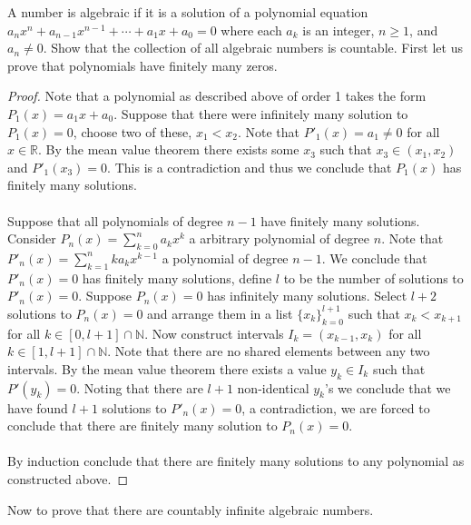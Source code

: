 \documentclass[12pt]{article}
\makeatletter
\theoremstyle{homework}
\newenvironment{exercise}[1]
{\def\@currentlabel{#1}\exercisecore}
{\endexercisecore}
\makeatother
\begin{document}
\begin{exercise}
2
A number is algebraic if it is a solution of a polynomial equation $a_nx^n + a_{n−1}x^{n−1} + \cdots + a_1x + a_0 = 0$ where each $a_k$ is an integer, $n \geq 1$, and $a_n \neq 0$. Show that the collection of all algebraic numbers is countable.
\end{exercise}
First let us prove that polynomials have finitely many zeros.
\begin{proof}
Note that a polynomial as described above of order 1 takes the form $P_1(x)=a_1x+a_0$.  Suppose that there were infinitely many solution to $P_1(x)=0$, choose two of these, $x_1<x_2$.  Note that $P'_1(x)=a_1\neq 0$ for all $x\in\mathbb{R}$.  By the mean value theorem there exists some $x_3$ such that $x_3\in(x_1,x_2)$ and $P'_1(x_3)=0$.  This is a contradiction and thus we conclude that $P_1(x)$ has finitely many solutions.\\\\
Suppose that all polynomials of degree $n-1$ have finitely many solutions.  Consider $P_n(x)=\sum_{k=0}^n a_k x^k$ a arbitrary polynomial of degree $n$.  Note that $P'_n(x)=\sum_{k=1}^n ka_k x^{k-1}$ a polynomial of degree $n-1$.  We conclude that $P'_n(x)=0$ has finitely many solutions, define $l$ to be the number of solutions to $P'_n(x)=0$.  Suppose $P_n(x)=0$ has infinitely many solutions.  Select $l+2$ solutions to $P_n(x)=0$ and arrange them in a list $\{x_k\}_{k=0}^{l+1}$ such that $x_k<x_{k+1}$ for all $k\in [0,l+1]\cap\mathbb{N}$.  Now construct intervals $I_k=(x_{k-1},x_k)$ for all $k\in [1,l+1]\cap\mathbb{N}$.  Note that there are no shared elements between any two intervals.  By the mean value theorem there exists a value $y_k\in I_k$ such that $P'(y_k)=0$.  Noting that there are $l+1$ non-identical $y_k$'s we conclude that we have found $l+1$ solutions to $P'_n(x)=0$, a contradiction, we are forced to conclude that there are finitely many solution to $P_n(x)=0$.\\\\
By induction conclude that there are finitely many solutions to any polynomial as constructed above.
\end{proof}
Now to prove that there are countably infinite algebraic numbers.
\end{document}

